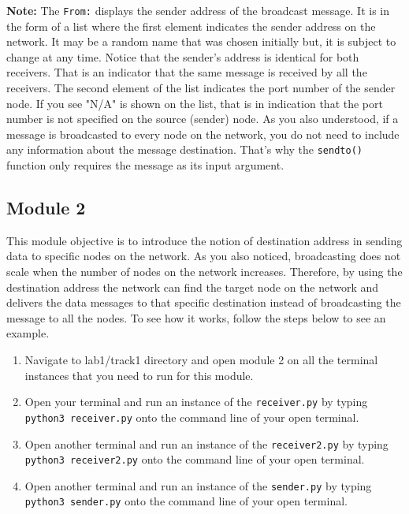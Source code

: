 \documentclass[11pt]{article}
\begin{document}

\textbf{Note:}
The \texttt{From:} displays the sender address of the broadcast message. It is in the form of a list where the first element indicates the sender address on the network. It may be a random name that was chosen initially but, it is subject to change at any time. Notice that the sender's address is identical for both receivers. That is an indicator that the same message is received by all the receivers. The second element of the list indicates the port number of the sender node.
If you see "N/A" is shown on the list, that is in indication that the port number is not specified on the source (sender) node. As you also understood, if a message is broadcasted to every node on the network, you do not need to include any information about the message destination. That's why the \texttt{sendto()} function only requires the message as its input argument.


\subsection{Module 2}
\label{subsec:module2}
This module objective is to introduce the notion of destination address in sending data to specific nodes on the network. As you also noticed, broadcasting does not scale when the number of nodes on the network increases. Therefore, by using the destination address the network can find the target node on the network and delivers the data messages to that specific destination instead of broadcasting the message to all the nodes. To see how it works, follow the steps below to see an example.


\begin{enumerate}
    \item Navigate to lab1/track1 directory and open module 2 on all the terminal instances that you need to run for this module.
    \item Open your terminal and run an instance of the \texttt{receiver.py} by typing \texttt{python3 receiver.py} onto the command line of your open terminal.
    \item Open another terminal and run an instance of the \texttt{receiver2.py} by typing \texttt{python3 receiver2.py} onto the command line of your open terminal.
    \item Open another terminal and run an instance of the \texttt{sender.py} by typing \texttt{python3 sender.py} onto the command line of your open terminal.
\end{enumerate}
\end{document}
